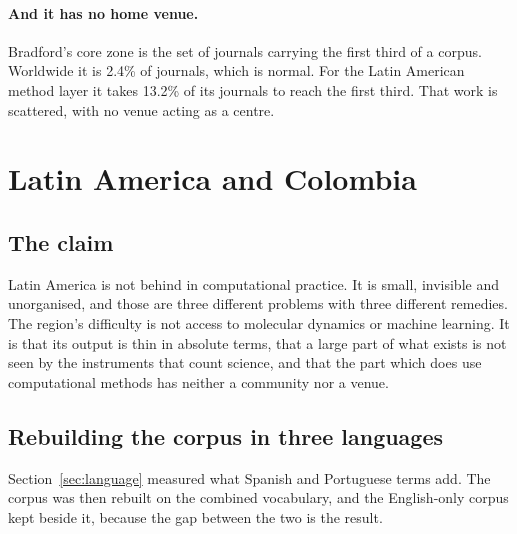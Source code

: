 \documentclass[11pt,a4paper]{article}
\begin{document}
\paragraph{And it has no home venue.} Bradford's core zone is the set of journals carrying
the first third of a corpus. Worldwide it is 2.4\% of journals, which is normal. For
the Latin American method layer it takes 13.2\% of its journals to reach the first
third. That work is scattered, with no venue acting as a centre.


\section{Latin America and Colombia}
\label{sec:region}

\subsection{The claim}

Latin America is not behind in computational practice. It is small, invisible and
unorganised, and those are three different problems with three different remedies. The
region's difficulty is not access to molecular dynamics or machine learning. It is that its
output is thin in absolute terms, that a large part of what exists is not seen by the
instruments that count science, and that the part which does use computational methods has
neither a community nor a venue.

\subsection{Rebuilding the corpus in three languages}
\label{sec:combined}

Section~\ref{sec:language} measured what Spanish and Portuguese terms add. The corpus was
then rebuilt on the combined vocabulary, and the English-only corpus kept beside it, because
the gap between the two is the result.
\end{document}
